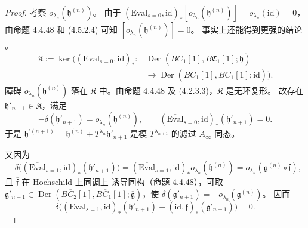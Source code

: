 \begin{proof}
考察 $o_{\lambda_n}(\mathfrak h^{(n)})$。
由于
$(\overline{\mathrm{Eval}}_{s=0},
\mathrm{id})_*
[o_{\lambda_n}(\mathfrak h^{(n)})]
=o_{\lambda_n}(\mathrm{id})=0$，
由命题 4.4.48 和 (4.5.2.4) 可知
$[o_{\lambda_n}(\mathfrak h^{(n)})]=0$。
事实上还能得到更强的结论
。
\begin{equation}
 \begin{aligned}
 \mathfrak K:=\ker\bigl(
 (\overline{\mathrm{Eval}}_{s=0},\mathrm{id})_*
 \colon&
 \operatorname{Der}
 (B\overline C_1[1],
 B\overline{\mathfrak C}_1[1];
 \overline{\mathfrak h})\\
 &\longrightarrow
 \operatorname{Der}
 (B\overline C_1[1],
 B\overline C_1[1];\mathrm{id})
 \bigr).
 \end{aligned}
\tag{4.5.20}\label{eq:4-5-20}
\end{equation}
障碍
$o_{\lambda_n}(\mathfrak h^{(n)})$
落在 $\mathfrak K$ 中。由命题 4.4.48
及 (4.2.3.3)，$\mathfrak K$ 是无环复形。
故存在 $\mathfrak h'_{n+1}\in\mathfrak K$，满足
\[
 -\delta(\mathfrak h'_{n+1})
 =o_{\lambda_n}(\mathfrak h^{(n)}),
 \qquad
 (\overline{\mathrm{Eval}}_{s=0},\mathrm{id})_*
 (\mathfrak h'_{n+1})=0.
\]
于是
$\mathfrak h^{\prime(n+1)}
=\mathfrak h^{(n)}
+T^{\lambda_n}\mathfrak h'_{n+1}$
是模 $T^{\lambda_{n+1}}$ 的滤过
$A_\infty$ 同态。

又因为
\[
 -\delta\bigl(
 (\overline{\mathrm{Eval}}_{s=1},\mathrm{id})_*
 (\mathfrak h'_{n+1})\bigr)
 =
 (\overline{\mathrm{Eval}}_{s=1},\mathrm{id})_*
 o_{\lambda_n}(\mathfrak h^{(n)})
 =
 o_{\lambda_n}(\mathfrak g^{(n)}\circ\mathfrak f),
\]
且 $\overline{\mathfrak f}$ 在 Hochschild 上同调上
诱导同构（命题 4.4.48），可取
$\mathfrak g'_{n+1}
\in\operatorname{Der}
(B\overline C_2[1],B\overline C_1[1];
\overline{\mathfrak g})$，使
$\delta(\mathfrak g'_{n+1})
=-o_{\lambda_n}(\mathfrak g^{(n)})$。
因而
\[
 \delta\bigl(
 (\overline{\mathrm{Eval}}_{s=1},\mathrm{id})_*
 (\mathfrak h'_{n+1})
 -
 (\mathrm{id},\overline{\mathfrak f})_*
 (\mathfrak g'_{n+1})\bigr)=0.
\]


\end{proof}
